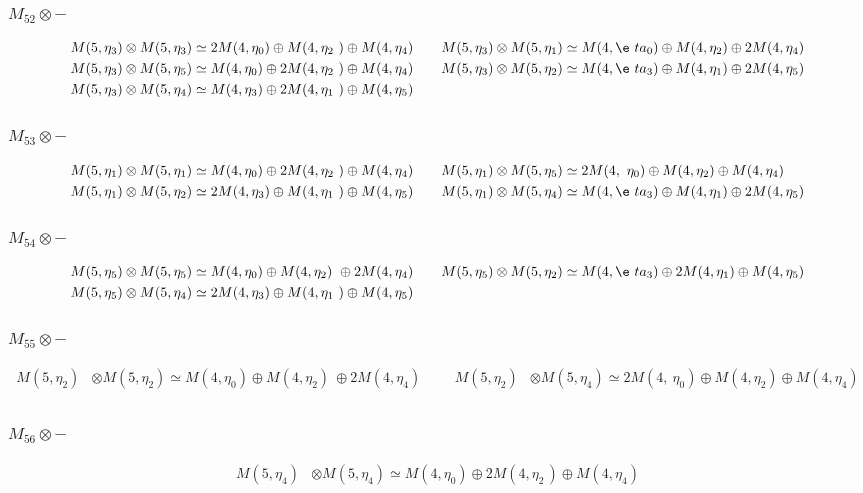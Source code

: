 \subsubsection{$M_52\otimes -$}
\begin{align*}
M(5,\eta_{3}) &\otimes M(5,\eta_{3}) \simeq 2 M(4,\eta_{0}) \oplus M(4,\eta_{2\
}) \oplus M(4,\eta_{4}) &&& M(5,\eta_{3}) &\otimes M(5,\eta_{1}) \simeq M(4,\e\
ta_{0}) \oplus M(4,\eta_{2}) \oplus 2 M(4,\eta_{4})\\
M(5,\eta_{3}) &\otimes M(5,\eta_{5}) \simeq M(4,\eta_{0}) \oplus 2 M(4,\eta_{2\
}) \oplus M(4,\eta_{4}) &&& M(5,\eta_{3}) &\otimes M(5,\eta_{2}) \simeq M(4,\e\
ta_{3}) \oplus M(4,\eta_{1}) \oplus 2 M(4,\eta_{5})\\
M(5,\eta_{3}) &\otimes M(5,\eta_{4}) \simeq M(4,\eta_{3}) \oplus 2 M(4,\eta_{1\
}) \oplus M(4,\eta_{5})\\
\end{align*}

\subsubsection{$M_53\otimes -$}
\begin{align*}
M(5,\eta_{1}) &\otimes M(5,\eta_{1}) \simeq M(4,\eta_{0}) \oplus 2 M(4,\eta_{2\
}) \oplus M(4,\eta_{4}) &&& M(5,\eta_{1}) &\otimes M(5,\eta_{5}) \simeq 2 M(4,\
\eta_{0}) \oplus M(4,\eta_{2}) \oplus M(4,\eta_{4})\\
M(5,\eta_{1}) &\otimes M(5,\eta_{2}) \simeq 2 M(4,\eta_{3}) \oplus M(4,\eta_{1\
}) \oplus M(4,\eta_{5}) &&& M(5,\eta_{1}) &\otimes M(5,\eta_{4}) \simeq M(4,\e\
ta_{3}) \oplus M(4,\eta_{1}) \oplus 2 M(4,\eta_{5})\\
\end{align*}

\subsubsection{$M_54\otimes -$}
\begin{align*}
M(5,\eta_{5}) &\otimes M(5,\eta_{5}) \simeq M(4,\eta_{0}) \oplus M(4,\eta_{2})\
 \oplus 2 M(4,\eta_{4}) &&& M(5,\eta_{5}) &\otimes M(5,\eta_{2}) \simeq M(4,\e\
ta_{3}) \oplus 2 M(4,\eta_{1}) \oplus M(4,\eta_{5})\\
M(5,\eta_{5}) &\otimes M(5,\eta_{4}) \simeq 2 M(4,\eta_{3}) \oplus M(4,\eta_{1\
}) \oplus M(4,\eta_{5})\\
\end{align*}

\subsubsection{$M_55\otimes -$}
\begin{align*}
M(5,\eta_{2}) &\otimes M(5,\eta_{2}) \simeq M(4,\eta_{0}) \oplus M(4,\eta_{2})\
 \oplus 2 M(4,\eta_{4}) &&& M(5,\eta_{2}) &\otimes M(5,\eta_{4}) \simeq 2 M(4,\
\eta_{0}) \oplus M(4,\eta_{2}) \oplus M(4,\eta_{4})\\
\end{align*}

\subsubsection{$M_56\otimes -$}
\begin{align*}
M(5,\eta_{4}) &\otimes M(5,\eta_{4}) \simeq M(4,\eta_{0}) \oplus 2 M(4,\eta_{2\
}) \oplus M(4,\eta_{4})\\
\end{align*}

